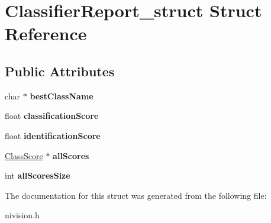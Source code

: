 \hypertarget{structClassifierReport__struct}{
\section{ClassifierReport\_\-struct Struct Reference}
\label{structClassifierReport__struct}
}
\subsection*{Public Attributes}
\begin{DoxyCompactItemize}
\item 
\hypertarget{structClassifierReport__struct_a5dbf439169d3f3a5bf361bd65fa739f9}{
char $\ast$ {\bfseries bestClassName}}
\label{structClassifierReport__struct_a5dbf439169d3f3a5bf361bd65fa739f9}

\item 
\hypertarget{structClassifierReport__struct_a76d07bf57683b72cbdcd9a6a1bc586cd}{
float {\bfseries classificationScore}}
\label{structClassifierReport__struct_a76d07bf57683b72cbdcd9a6a1bc586cd}

\item 
\hypertarget{structClassifierReport__struct_ad4474ccccb21485d6e4b043a86d0fea8}{
float {\bfseries identificationScore}}
\label{structClassifierReport__struct_ad4474ccccb21485d6e4b043a86d0fea8}

\item 
\hypertarget{structClassifierReport__struct_a82bb29115a79eae84b93d4940dccb07c}{
\hyperlink{structClassScore__struct}{ClassScore} $\ast$ {\bfseries allScores}}
\label{structClassifierReport__struct_a82bb29115a79eae84b93d4940dccb07c}

\item 
\hypertarget{structClassifierReport__struct_a60c6a5df95011dc6aee2c3af64f09bef}{
int {\bfseries allScoresSize}}
\label{structClassifierReport__struct_a60c6a5df95011dc6aee2c3af64f09bef}

\end{DoxyCompactItemize}


The documentation for this struct was generated from the following file:\begin{DoxyCompactItemize}
\item 
nivision.h\end{DoxyCompactItemize}
